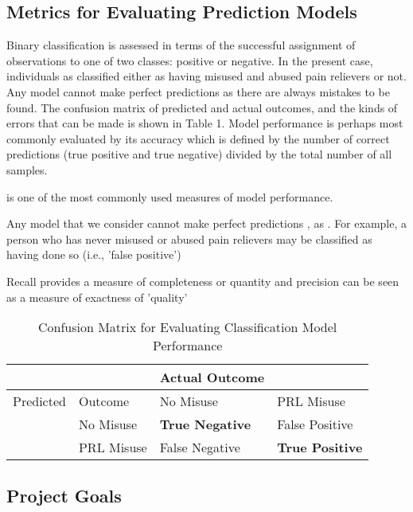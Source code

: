 \documentclass[sigconf]{acmart}
\begin{document}

\subsection{Metrics for Evaluating Prediction Models}

Binary classification is assessed in terms of the successful assignment of 
observations to one of two classes: positive or negative. In the present case,
individuals as classified either as having misused and abused pain relievers 
or not. Any model cannot make perfect predictions as there are always mistakes 
to be found. The confusion matrix of predicted and actual outcomes, and the 
kinds of errors that can be made is shown in Table 1. Model performance is
perhaps most commonly evaluated by its accuracy which is defined by the number 
of correct predictions (true positive and true negative) divided by the total 
number of all samples.  

is one of the most commonly
used measures of model performance. 


Any model that we consider
cannot make perfect predictions
, as . For example, 
a person who has never misused or abused pain relievers may be classified 
as having done so (i.e., 'false positive') 

Recall provides a measure of completeness or quantity and precision can be seen as a measure of exactness of 'quality' \cite{wiki18}



\begin{table}
  \caption{Confusion Matrix for Evaluating Classification Model Performance}
  \label{tab:freq}
  \begin{tabular}{llll}
    \toprule
     &  &  Actual Outcome & \\
    \midrule
     Predicted & Outcome & No Misuse & PRL Misuse \\
    \midrule
     & No Misuse & \textbf{True Negative} & False Positive \\
    \midrule
     & PRL Misuse & False Negative & \textbf{True Positive} \\
    \bottomrule
  \end{tabular}
\end{table}





\subsection{Project Goals} 
\end{document}
